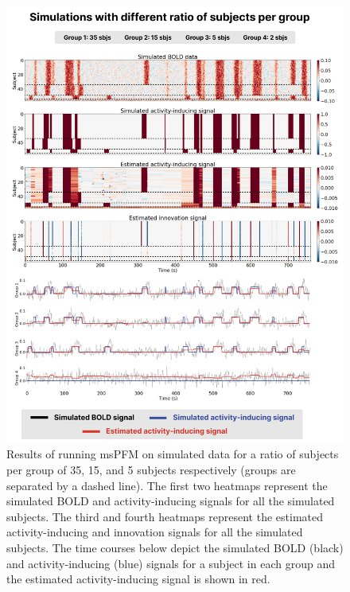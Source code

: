\begin{figure}[!ht]
    \centering
    \includegraphics[width=0.8\linewidth]{figures/multi_subject/sim_diff_ratio.png}
    \caption{Results of running msPFM on simulated data for a ratio of subjects
    per group of 35, 15, and 5 subjects respectively (groups are separated by a
    dashed line). The first two heatmaps represent the simulated BOLD and
    activity-inducing signals for all the simulated subjects. The third and
    fourth heatmaps represent the estimated activity-inducing and innovation
    signals for all the simulated subjects. The time courses below depict the
    simulated BOLD (black) and activity-inducing (blue) signals for a subject in
    each group and the estimated activity-inducing signal is shown in red.}
    \label{fig:simulations_diff}
\end{figure}


